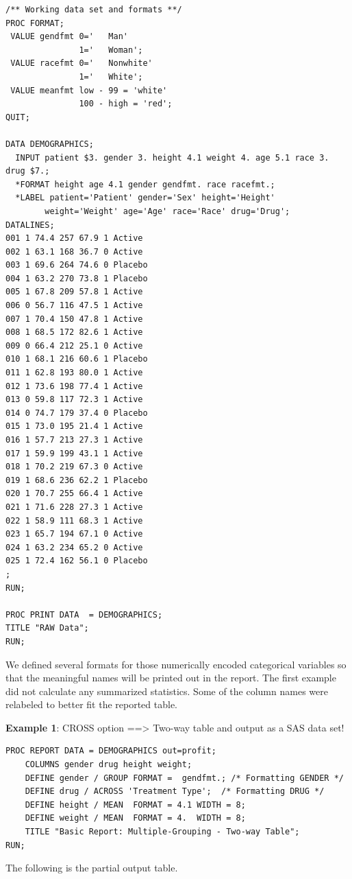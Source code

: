 \documentclass[
]{book}
\begin{document}
\begin{verbatim}
/** Working data set and formats **/
PROC FORMAT;
 VALUE gendfmt 0='   Man'
               1='   Woman';
 VALUE racefmt 0='   Nonwhite'
               1='   White';
 VALUE meanfmt low - 99 = 'white'
               100 - high = 'red';
QUIT;

DATA DEMOGRAPHICS; 
  INPUT patient $3. gender 3. height 4.1 weight 4. age 5.1 race 3. drug $7.;
  *FORMAT height age 4.1 gender gendfmt. race racefmt.;
  *LABEL patient='Patient' gender='Sex' height='Height'
        weight='Weight' age='Age' race='Race' drug='Drug';
DATALINES;
001 1 74.4 257 67.9 1 Active
002 1 63.1 168 36.7 0 Active
003 1 69.6 264 74.6 0 Placebo
004 1 63.2 270 73.8 1 Placebo
005 1 67.8 209 57.8 1 Active
006 0 56.7 116 47.5 1 Active
007 1 70.4 150 47.8 1 Active
008 1 68.5 172 82.6 1 Active
009 0 66.4 212 25.1 0 Active
010 1 68.1 216 60.6 1 Placebo
011 1 62.8 193 80.0 1 Active
012 1 73.6 198 77.4 1 Active
013 0 59.8 117 72.3 1 Active
014 0 74.7 179 37.4 0 Placebo
015 1 73.0 195 21.4 1 Active
016 1 57.7 213 27.3 1 Active
017 1 59.9 199 43.1 1 Active
018 1 70.2 219 67.3 0 Active
019 1 68.6 236 62.2 1 Placebo
020 1 70.7 255 66.4 1 Active
021 1 71.6 228 27.3 1 Active
022 1 58.9 111 68.3 1 Active
023 1 65.7 194 67.1 0 Active
024 1 63.2 234 65.2 0 Active
025 1 72.4 162 56.1 0 Placebo
;
RUN;

PROC PRINT DATA  = DEMOGRAPHICS;
TITLE "RAW Data";
RUN;
\end{verbatim}

We defined several formats for those numerically encoded categorical variables so that the meaningful names will be printed out in the report. The first example did not calculate any summarized statistics. Some of the column names were relabeled to better fit the reported table.

\textbf{Example 1}: CROSS option ==\textgreater{} Two-way table and output as a SAS data set!

\begin{verbatim}
PROC REPORT DATA = DEMOGRAPHICS out=profit;
    COLUMNS gender drug height weight;
    DEFINE gender / GROUP FORMAT =  gendfmt.; /* Formatting GENDER */
    DEFINE drug / ACROSS 'Treatment Type';  /* Formatting DRUG */
    DEFINE height / MEAN  FORMAT = 4.1 WIDTH = 8;  
    DEFINE weight / MEAN  FORMAT = 4.  WIDTH = 8;
    TITLE "Basic Report: Multiple-Grouping - Two-way Table";
RUN;
\end{verbatim}

The following is the partial output table.
\end{document}
